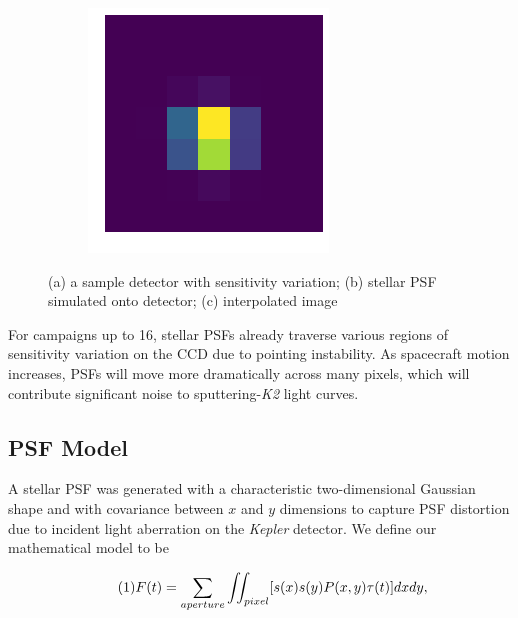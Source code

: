 \documentclass[12pt,preprint]{aastex}
\begin{document}
\begin{figure}[h!]
\begin{subfigure}[b]{0.25\textwidth}
		\caption{}
  \end{subfigure}%
	\quad
	\begin{subfigure}[b]{0.25\textwidth}
		\centering
		\includegraphics[width=.85\linewidth]{interpolated.png}
		\caption{}
	\end{subfigure}
	\caption{(a) a sample detector with sensitivity variation; (b) stellar PSF simulated onto detector; (c) interpolated image}
  \label{fig:detector}
\end{figure}

For campaigns up to 16, stellar PSFs already traverse various regions of sensitivity variation on the CCD due to pointing instability. As spacecraft motion increases, PSFs will move more dramatically across many pixels, which will contribute significant noise to sputtering-\textit{K2} light curves.

\subsection{PSF Model}

A stellar PSF was generated with a characteristic two-dimensional Gaussian shape and with covariance between $x$ and $y$ dimensions to capture PSF distortion due to incident light aberration on the \textit{Kepler} detector. We define our mathematical model to be

\[
\tag{1}
F(t)=\sum_{aperture} \iint_{pixel} [s(x)s(y)P(x,y)\tau (t)]dxdy,\\
\]
\end{document}
